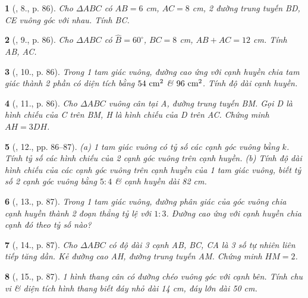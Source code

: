 \documentclass{article}
\newtheorem{baitoan}{}
\begin{document}
\begin{baitoan}[\cite{Binh_Toan_9_tap_1}, 8., p. 86]
	Cho $\Delta ABC$ có $AB = 6$ {\rm cm}, $AC = 8$ {\rm cm}, 2 đường trung tuyến BD, CE vuông góc với nhau. Tính BC.
\end{baitoan}

\begin{baitoan}[\cite{Binh_Toan_9_tap_1}, 9., p. 86]
	Cho $\Delta ABC$ có $\widehat{B} = 60^\circ$, $BC = 8$ {\rm cm}, $AB + AC = 12$ {\rm cm}. Tính AB, AC.
\end{baitoan}

\begin{baitoan}[\cite{Binh_Toan_9_tap_1}, 10., p. 86]
	Trong 1 tam giác vuông, đường cao ứng với cạnh huyền chia tam giác thành 2 phần có diện tích bằng $\rm54\ cm^2$ \& $\rm96\ cm^2$. Tính độ dài cạnh huyền.
\end{baitoan}

\begin{baitoan}[\cite{Binh_Toan_9_tap_1}, 11., p. 86]
	Cho $\Delta ABC$ vuông cân tại A, đường trung tuyến BM. Gọi D là hình chiếu của C trên BM, H là hình chiếu của D trên AC. Chứng minh $AH = 3DH$.
\end{baitoan}

\begin{baitoan}[\cite{Binh_Toan_9_tap_1}, 12., pp. 86--87]
	(a) 1 tam giác vuông có tỷ số các cạnh góc vuông bằng $k$. Tính tỷ số các hình chiếu của 2 cạnh góc vuông trên cạnh huyền. (b) Tính độ dài hình chiếu của các cạnh góc vuông trên cạnh huyền của 1 tam giác vuông, biết tỷ số 2 cạnh góc vuông bằng $5:4$ \& cạnh huyền dài {\rm82 cm}.
\end{baitoan}

\begin{baitoan}[\cite{Binh_Toan_9_tap_1}, 13., p. 87]
	Trong 1 tam giác vuông, đường phân giác của góc vuông chia cạnh huyền thành 2 đoạn thẳng tỷ lệ với $1:3$. Đường cao ứng với cạnh huyền chia cạnh đó theo tỷ số nào?
\end{baitoan}

\begin{baitoan}[\cite{Binh_Toan_9_tap_1}, 14., p. 87]
	Cho $\Delta ABC$ có độ dài 3 cạnh AB, BC, CA là 3 số tự nhiên liên tiếp tăng dần. Kẻ đường cao AH, đường trung tuyến AM. Chứng minh $HM = 2$.
\end{baitoan}

\begin{baitoan}[\cite{Binh_Toan_9_tap_1}, 15., p. 87]
	1 hình thang cân có đường chéo vuông góc với cạnh bên. Tính chu vi \& diện tích hình thang biết đáy nhỏ dài {\rm14 cm}, đáy lớn dài {\rm50 cm}.
\end{baitoan}
\end{document}

